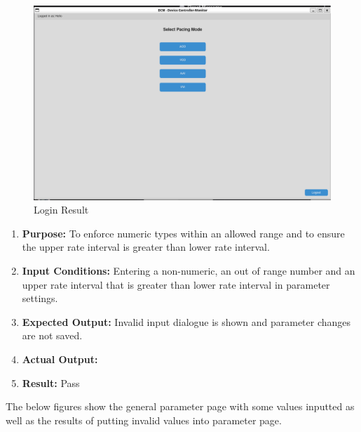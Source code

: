 \documentclass{article}
\newcounter{subsubsubsection}[subsubsection]
\begin{document}
\begin{tcolorbox}
    \begin{figure}[H]\label{logres}
        \includegraphics[width=\textwidth]{loginres.png}
        \caption{Login Result}
    \end{figure}
\end{tcolorbox}

\newpage
{}
\begin{enumerate}[label=]
   \item \textbf{Purpose:} To enforce numeric types within an allowed range and to ensure the upper rate interval is greater than lower rate interval. 
   \item \textbf{Input Conditions:} Entering a non-numeric, an out of range number and an upper rate interval that is greater than lower rate interval in parameter settings. 
   \item \textbf{Expected Output:} Invalid input dialogue is shown and parameter changes are not saved.
   \item \textbf{Actual Output:}  
   \item \textbf{Result:} Pass
\end{enumerate}


The below figures show the general parameter page with some values inputted as well as the results of putting 
invalid values into parameter page. 
\end{document}
